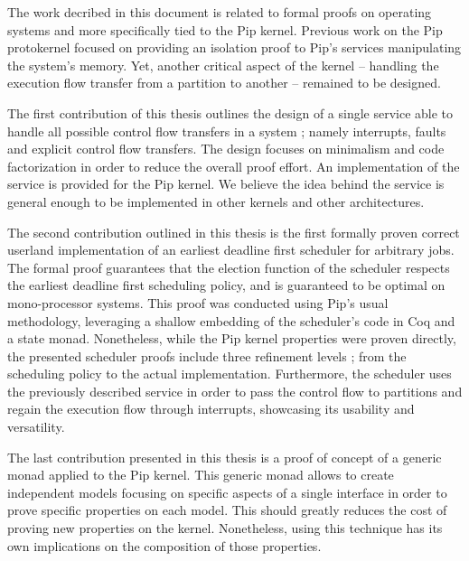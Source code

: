 The work decribed in this document is related to formal proofs on operating systems and more specifically tied to the Pip kernel.
Previous work on the Pip protokernel focused on providing an isolation proof to Pip's services manipulating the system's memory. Yet, another critical aspect of the kernel -- handling the execution flow transfer from a partition to another -- remained to be designed.

The first contribution of this thesis outlines the design of a single service able to handle all possible control flow transfers in a system ; namely interrupts, faults and explicit control flow transfers. The design focuses on minimalism and code factorization in order to reduce the overall proof effort. An implementation of the service is provided for the Pip kernel. We believe the idea behind the service is general enough to be implemented in other kernels and other architectures.

The second contribution outlined in this thesis is the first formally proven correct userland implementation of an earliest deadline first scheduler for arbitrary jobs. The formal proof guarantees that the election function of the scheduler respects the earliest deadline first scheduling policy, and is guaranteed to be optimal on mono-processor systems. This proof was conducted using Pip's usual methodology, leveraging a shallow embedding of the scheduler's code in Coq and a state monad. Nonetheless, while the Pip kernel properties were proven directly, the presented scheduler proofs include three refinement levels ; from the scheduling policy to the actual implementation. Furthermore, the scheduler uses the previously described service in order to pass the control flow to partitions and regain the execution flow through interrupts, showcasing its usability and versatility.

The last contribution presented in this thesis is a proof of concept of a generic monad applied to the Pip kernel. This generic monad allows to create independent models focusing on specific aspects of a single interface in order to prove specific properties on each model. This should greatly reduces the cost of proving new properties on the kernel. Nonetheless, using this technique has its own implications on the composition of those properties.
